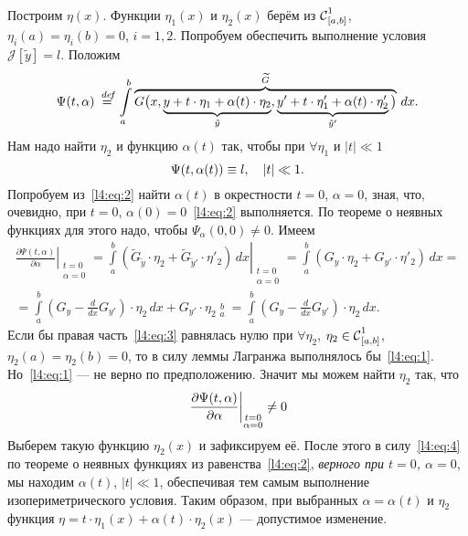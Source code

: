\documentclass[12pt,a4paper,openany,fleqn]{book}
\newcommand {\defeq}{\stackrel{\hspace{0.09 cm}de\!f}{=}}
\newcommand {\eqdef}{\defeq}
\newcommand{\Cf}{\ensuremath{\mathcal{C}}}
\newcommand{\J}{\ensuremath{\mathcal{J}}}
\newcommand{\Cfn}[2][]{\ensuremath{\Cf{\mathstrut}^{#2}_{#1}}}
\newcommand{\der}[2]{\ensuremath{\frac{d#1}{d#2}}}
\newcommand{\pder}[2]{\ensuremath{\frac{\partial#1}{\partial#2}}}
\theoremstyle{definition}
\begin{document}
	Построим $\eta(x)$. Функции $\eta_1(x)$ и $\eta_2(x)$ берём из $\Cfn[{[a,b]}]{1}$, $\eta_i(a)=\eta_i(b)=0$, $i=1,2$. Попробуем обеспечить выполнение условия $\J[\tilde{y}]=l$. Положим
	\begin{equation*}
		\Psi(t,\alpha)\eqdef\int\limits_a^b \overbrace{G\big(x,\underbrace{y+t\cdot\eta_1+\alpha(t)\cdot\eta_2}_{\tilde{y}},\underbrace{y'+t\cdot\eta'_1+\alpha(t)\cdot\eta'_2}_{\tilde{y}'}\big)}^{\widetilde{G}}\,dx.
	\end{equation*}
Нам надо найти $\eta_2$ и функцию $\alpha(t)$ так, чтобы при $\forall\eta_1$ и $|t|\ll1$
\begin{equation}
	\label{l4:eq:2}
	\hfill\Psi(t,\alpha(t))\equiv l,\quad|t|\ll1.\hfill
\end{equation}
Попробуем из~\eqref{l4:eq:2} найти $\alpha(t)$ в окрестности $t=0$, $\alpha=0$, зная, что, очевидно, при $t=0$, ${\alpha(0)=0}$~\eqref{l4:eq:2} выполняется. По теореме о неявных функциях для этого надо, чтобы $\Psi_{\alpha}(0,0)\neq0$. Имеем
\begin{multline}
	\label{l4:eq:3}
	\left.\pder{\Psi(t,\alpha)}{\alpha}\right|_{\substack{t=0\\\alpha=0}}=\left.\int\limits_a^b\left(\widetilde{G}_{\tilde{y}}\cdot\eta_2+\widetilde{G}_{\tilde{y}'}\cdot\eta'_2\right)\,dx\right|_{\substack{t=0\\\alpha=0}}=\int\limits_a^b\left({G}_{{y}}\cdot\eta_2+{G}_{y'}\cdot\eta'_2\right)\,dx=\\
	=\int\limits_a^b\left(G_y-\der{}{x}G_{y'}\right)\cdot\eta_2\,dx+G_{y'}\cdot\eta_2\mathop{\Big|}\limits_a^b=\int\limits_a^b\left(G_y-\der{}{x}G_{y'}\right)\cdot\eta_2\,dx.
\end{multline}
Если бы правая часть~\eqref{l4:eq:3} равнялась нулю при $\forall\eta_2$, $\eta_2\in\Cfn[{[a,b]}]{1}$, $\eta_2(a)=\eta_2(b)=0$, то в силу леммы Лагранжа выполнялось бы~\eqref{l4:eq:1}. Но~\eqref{l4:eq:1} --- не верно по предположению. Значит мы можем найти $\eta_2$ так, что
\begin{equation}
	\label{l4:eq:4}
	\hfill\left.\pder{\Psi(t,\alpha)}{\alpha}\right|_{\substack{t=0\\\alpha=0}}\neq0\hfill
\end{equation}
Выберем такую функцию $\eta_2(x)$ и зафиксируем её. После этого в силу~\eqref{l4:eq:4} по теореме о неявных функциях из равенства~\eqref{l4:eq:2}, \emph{верного при  $t=0$, $\alpha=0$}, мы находим $\alpha(t)$, $|t|\ll1$, обеспечивая тем самым выполнение изопериметрического условия. Таким образом, при выбранных $\alpha=\alpha(t)$ и $\eta_2$ функция $\eta=t\cdot\eta_1(x)+\alpha(t)\cdot\eta_2(x)$ --- допустимое изменение.
\end{document}
